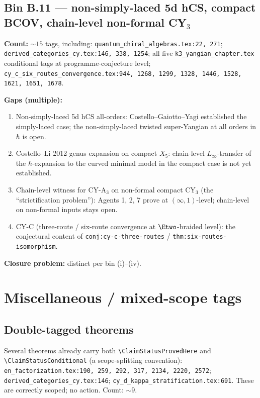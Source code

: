 \documentclass[11pt]{amsart}
\begin{document}
{{\subsection{Bin B.11 --- non-simply-laced 5d hCS, compact BCOV, chain-level non-formal CY$_3$}
\label{subsec:still-b11}

\textbf{Count:} $\sim 15$ tags, including:
\texttt{quantum\_chiral\_algebras.tex:22, 271}; \texttt{derived\_categories\_cy.tex:146, 338, 1254}; all five \texttt{k3\_yangian\_chapter.tex} conditional tags at programme-conjecture level; \texttt{cy\_c\_six\_routes\_convergence.tex:944, 1268, 1299, 1328, 1446, 1528, 1621, 1651, 1678}.

\textbf{Gaps (multiple):}
\begin{enumerate}[label=(\roman*)]
\item Non-simply-laced 5d hCS all-orders: Costello--Gaiotto--Yagi
  established the simply-laced case; the non-simply-laced twisted
  super-Yangian at all orders in $\hbar$ is open.
\item Costello--Li 2012 genus expansion on compact $X_5$: chain-level
  $L_\infty$-transfer of the $\hbar$-expansion to the curved minimal
  model in the compact case is not yet established.
\item Chain-level witness for CY-A$_3$ on non-formal compact CY$_3$
  (the ``strictification problem''): Agents 1, 2, 7 prove at
  $(\infty,1)$-level; chain-level on non-formal inputs stays open.
\item CY-C (three-route / six-route convergence at $\Etwo$-braided
  level): the conjectural content of
  \texttt{conj:cy-c-three-routes} / \texttt{thm:six-routes-isomorphism}.
\end{enumerate}

\textbf{Closure problem:} distinct per bin (i)--(iv).

\section{Miscellaneous / mixed-scope tags}
\label{sec:misc}

\subsection{Double-tagged theorems}

Several theorems already carry both \texttt{\textbackslash ClaimStatusProvedHere}
and \texttt{\textbackslash ClaimStatusConditional} (a scope-splitting
convention): \texttt{en\_factorization.tex:190, 259, 292, 317, 2134, 2220, 2572};
\texttt{derived\_categories\_cy.tex:146}; \texttt{cy\_d\_kappa\_stratification.tex:691}.
These are correctly scoped; no action. Count: $\sim 9$.

}}
\end{document}
